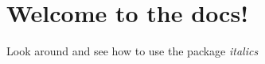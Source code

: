 \chapter{Welcome to the docs! }
\hypertarget{index}{}\label{index}
\label{index_mainpage}%
%


Look around and see how to use the package {\itshape italics} 